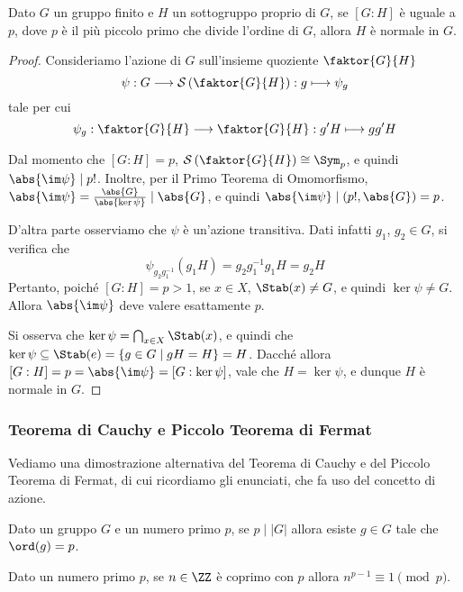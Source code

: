 \documentclass[11pt]{scrartcl}
\begin{document}
	\begin{proposition}
		Dato $G$ un gruppo finito e $H$ un sottogruppo proprio di $G$, se $[G:H]$ è uguale
		a $p$, dove
		$p$ è il più piccolo primo che divide l'ordine di $G$, allora $H$ è normale
		in $G$.
	\end{proposition}
	
	\begin{proof}
		Consideriamo l'azione di $G$ sull'insieme quoziente $\faktor{G}{H}$ 
		\[
		\psi: G\longrightarrow\mathcal{S}\left(\faktor{G}{H}\right) : g \longmapsto \psi_g
		\]
		tale per cui
		\[
		\psi_g : \faktor{G}{H}\longrightarrow\faktor{G}{H} : g'H\longmapsto gg'H
		\]
		
		Dal momento che $[G : H] = p$, $\mathcal{S}\left(\faktor{G}{H}\right) \cong \Sym_p$,
		e quindi $\abs{\im \psi} \mid p!$. Inoltre, per il Primo Teorema di Omomorfismo,
		$\abs{\im \psi} = \frac{\abs{G}}{\abs{\ker \psi}} \mid \abs{G}$, e quindi
		$\abs{\im \psi} \mid (p!, \abs{G}) = p$. \medskip
		

		D'altra parte osserviamo che $\psi$ è un'azione transitiva. Dati infatti
		$g_1$, $g_2 \in G$, si verifica che
		\[ \psi_{g_2 g_1^{-1}}(g_1H) = g_2g_1^{-1}g_1H = g_2H \]
		Pertanto, poiché $[G : H] = p > 1$, se $x \in X$, $\Stab(x) \neq G$, e quindi
		$\ker \psi \neq G$. Allora $\abs{\im \psi}$ deve valere esattamente $p$. \medskip
		
		
		Si osserva che $\ker \psi = \bigcap_{x \in X} \Stab(x)$, e quindi
		che $\ker \psi \subseteq \Stab(e) = \{g \in G \mid gH = H \} = H$.
		Dacché allora $[G : H] = p = \abs{\im \psi} = [G : \ker \psi]$, vale
		che $H = \ker \psi$, e dunque $H$ è normale in $G$.
	\end{proof}
	
	
	\subsubsection{Teorema di Cauchy e Piccolo Teorema di Fermat}
	
	Vediamo una dimostrazione alternativa del Teorema di Cauchy e del Piccolo
	Teorema di Fermat, di cui ricordiamo gli enunciati, che fa uso del concetto
	di azione. 
	
	\begin{theorem}
		\label{teorema1.44}
		Dato un gruppo $G$ e un numero primo $p$, se $p\mid |G|$ allora esiste 
		$g \in G$ tale che $\ord(g) = p$.
	\end{theorem}
	
	\begin{theorem}
		\label{teorema1.45}
		Dato un numero primo $p$, se $n \in \ZZ$ è coprimo con $p$ allora 
		$n^{p - 1} \equiv 1 \pmod p$.
	\end{theorem}
	
\end{document}
